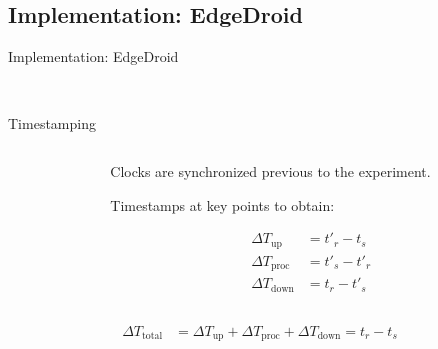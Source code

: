 \documentclass[aspectratio=1610]{beamer}
\begin{document}
\subsection{Implementation: EdgeDroid}
\begin{frame}{Implementation: EdgeDroid}
    \begin{center}
        \\
        \vspace{.1\textheight}
        \Large{}
    \end{center}
\end{frame}

\begin{frame}{Timestamping}
    \begin{columns}[onlytextwidth]
        \begin{column}{.5\linewidth}
            \footnotesize%
            \raggedright%
            
        \end{column}%
        \begin{column}{.5\linewidth}
            Clocks are synchronized previous to the experiment.

            \vspace{\baselineskip}%
            Timestamps at key points to obtain:

            \begin{align}
                {\Delta}T_\text{up}   & = t'_{r} - t_{s}  \\
                {\Delta}T_\text{proc} & = t'_{s} - t'_{r} \\
                {\Delta}T_\text{down} & = t_{r} - t'_{s}
            \end{align}
        \end{column}%
    \end{columns}
    \begin{align}
        {\Delta}T_\text{total} & = {\Delta}T_\text{up} + {\Delta}T_\text{proc} + {\Delta}T_\text{down} = t_{r} - t_{s}
    \end{align}
\end{frame}
\end{document}
